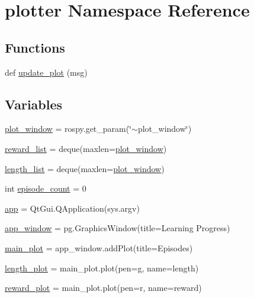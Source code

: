 \hypertarget{namespaceplotter}{}\section{plotter Namespace Reference}
\label{namespaceplotter}
\subsection*{Functions}
\begin{DoxyCompactItemize}
\item 
def \hyperlink{namespaceplotter_a4dd8967dd22ff14b03fcc921ec7dcc3d}{update\+\_\+plot} (msg)
\end{DoxyCompactItemize}
\subsection*{Variables}
\begin{DoxyCompactItemize}
\item 
\hyperlink{namespaceplotter_abbb49ab9c0174321374123fd800937f1}{plot\+\_\+window} = rospy.\+get\+\_\+param(\char`\"{}$\sim$plot\+\_\+window\char`\"{})
\item 
\hyperlink{namespaceplotter_aa648ebbb57476267f9430be51eeb420c}{reward\+\_\+list} = deque(maxlen=\hyperlink{namespaceplotter_abbb49ab9c0174321374123fd800937f1}{plot\+\_\+window})
\item 
\hyperlink{namespaceplotter_ab7eba5fc23c3791ab6bca7c5c975d2b8}{length\+\_\+list} = deque(maxlen=\hyperlink{namespaceplotter_abbb49ab9c0174321374123fd800937f1}{plot\+\_\+window})
\item 
int \hyperlink{namespaceplotter_aec1d6d729c0b25355f045e1f5bdc588f}{episode\+\_\+count} = 0
\item 
\hyperlink{namespaceplotter_ab20bf5077ebe79698f5f02f62dcb33d2}{app} = Qt\+Gui.\+Q\+Application(sys.\+argv)
\item 
\hyperlink{namespaceplotter_aac09effafbbcb0f637092be85f99c351}{app\+\_\+window} = pg.\+Graphics\+Window(title=\textquotesingle{}Learning Progress\textquotesingle{})
\item 
\hyperlink{namespaceplotter_a40d656a97d2e7039f17ee5742490ecf9}{main\+\_\+plot} = app\+\_\+window.\+add\+Plot(title=\textquotesingle{}Episodes\textquotesingle{})
\item 
\hyperlink{namespaceplotter_ac0842708a1e94becc6bb776a68a9ac5f}{length\+\_\+plot} = main\+\_\+plot.\+plot(pen=\textquotesingle{}g\textquotesingle{}, name=\textquotesingle{}length\textquotesingle{})
\item 
\hyperlink{namespaceplotter_a40062593c153ab9d59f836890f82dfc7}{reward\+\_\+plot} = main\+\_\+plot.\+plot(pen=\textquotesingle{}r\textquotesingle{}, name=\textquotesingle{}reward\textquotesingle{})
\end{DoxyCompactItemize}


